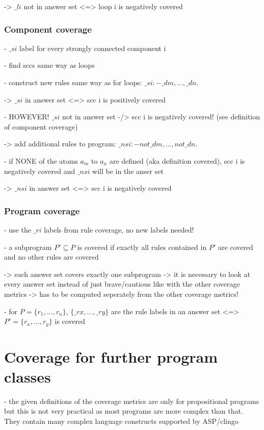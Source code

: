 -> $\_li$ not in answer set <=> loop i is negatively covered

\subsection{Component coverage}
\label{subsec:Computing coverage metrics for propositional programs/General approach/Component coverage}
- $\_si$ label for every strongly connected component i

- find sccs same way as loops

- construct new rules same way as for loops: $\_si :- \_dm, ... , \_dn$.

-> $\_si$ in answer set <=> scc i is positively covered

- HOWEVER! $\_si$ not in answer set -/> scc i is negatively covered! (see definition of component coverage)

-> add additional rules to program: $\_nsi :- not \_dm, ..., not \_dn$.

- if NONE of the atoms $a_m$ to $a_n$ are defined (aka definition covered), scc i is negatively covered and $\_nsi$ will be in the anser set

-> $\_nsi$ in answer set <=> scc i is negatively covered

\subsection{Program coverage}
\label{subsec:Computing coverage metrics for propositional programs/General approach/Program coverage}
- use the $\_ri$ labels from rule coverage, no new labels needed!

- a subprogram $P' \subseteq P$ is covered if exactly all rules contained in $P'$ are covered and no other rules are covered

-> each answer set covers exactly one subprogram -> it is necessary to look at every answer set instead of just brave/cautious like 
with the other coverage metrics -> has to be computed seperately from the other coverage metrics!

- for $P = \{r_1,...,r_n\}$,  $\{\_rx,...,\_ry\}$ are the rule labels in an answer set <=> $P'=\{r_x,...,r_y\}$ is covered

\chapter{Coverage for further program classes}
\label{ch:Coverage for further program classes}
- the given definitions of the coverage metrics are only for propositional programs but this is not very practical as most programs 
are more complex than that. They contain many complex language constructs supported by ASP/clingo

